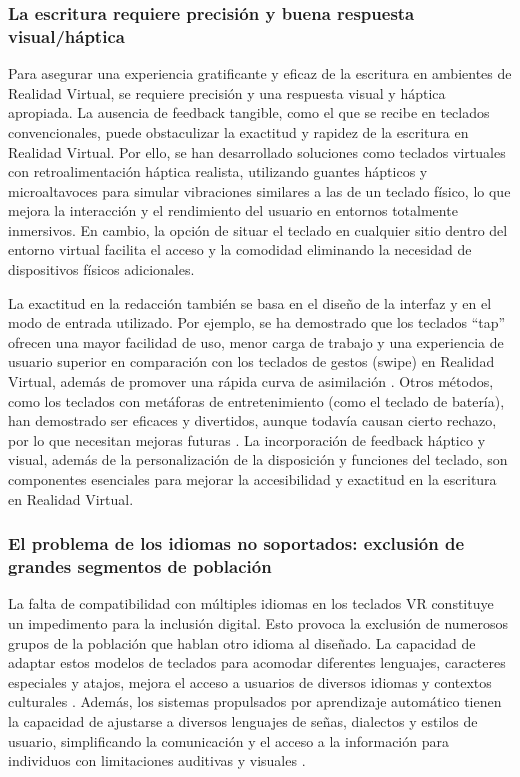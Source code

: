 \subsubsection{La escritura requiere precisión y buena respuesta visual/háptica}

Para asegurar una experiencia gratificante y eficaz de la escritura en ambientes de Realidad Virtual, se requiere precisión y una respuesta visual y háptica apropiada. La ausencia de feedback tangible, como el que se recibe en teclados convencionales, puede obstaculizar la exactitud y rapidez de la escritura en Realidad Virtual. Por ello, se han desarrollado soluciones como teclados virtuales con retroalimentación háptica realista, utilizando guantes hápticos y microaltavoces para simular vibraciones similares a las de un teclado físico, lo que mejora la interacción y el rendimiento del usuario en entornos totalmente inmersivos.  En cambio, la opción de situar el teclado en cualquier sitio dentro del entorno virtual facilita el acceso y la comodidad eliminando la necesidad de dispositivos físicos adicionales. \cite{Wu2017A}

La exactitud en la redacción también se basa en el diseño de la interfaz y en el modo de entrada utilizado. Por ejemplo, se ha demostrado que los teclados ``tap'' ofrecen una mayor facilidad de uso, menor carga de trabajo y una experiencia de usuario superior en comparación con los teclados de gestos (swipe) en Realidad Virtual, además de promover una rápida curva de asimilación \cite{Kern2023Text}.  Otros métodos, como los teclados con metáforas de entretenimiento (como el teclado de batería), han demostrado ser eficaces y divertidos, aunque todavía causan cierto rechazo, por lo que necesitan mejoras futuras \cite{Boletsis2019Text}. La incorporación de feedback háptico y visual, además de la personalización de la disposición y funciones del teclado, son componentes esenciales para mejorar la accesibilidad y exactitud en la escritura en Realidad Virtual. \cite{reconviguration}\cite{Wu2017A}

\subsubsection{El problema de los idiomas no soportados: exclusión de grandes segmentos de población}

La falta de compatibilidad con múltiples idiomas en los teclados VR constituye un impedimento para la inclusión digital. Esto provoca la exclusión de numerosos grupos de la población que hablan otro idioma al diseñado. La capacidad de adaptar estos modelos de teclados para acomodar diferentes lenguajes, caracteres especiales y atajos, mejora el acceso a usuarios de diversos idiomas y contextos culturales \cite{reconviguration}\cite{Wan2024Design}. Además, los sistemas propulsados por aprendizaje automático tienen la capacidad de ajustarse a diversos lenguajes de señas, dialectos y estilos de usuario, simplificando la comunicación y el acceso a la información para individuos con limitaciones auditivas y visuales \cite{Banerjee2024Machine-Learning-Based}.

